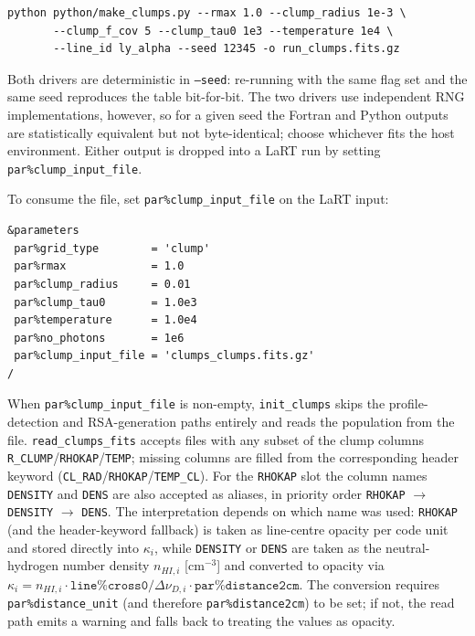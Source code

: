 \documentclass[english,a4paper]{my_memo}
\newcommand{\parm}[1]{\texttt{par\%#1}}
\begin{document}
\begin{lstlisting}
python python/make_clumps.py --rmax 1.0 --clump_radius 1e-3 \
       --clump_f_cov 5 --clump_tau0 1e3 --temperature 1e4 \
       --line_id ly_alpha --seed 12345 -o run_clumps.fits.gz
\end{lstlisting}

Both drivers are deterministic in \texttt{--seed}: re-running with the
same flag set and the same seed reproduces the table bit-for-bit.  The
two drivers use independent RNG implementations, however, so for a
given seed the Fortran and Python outputs are statistically equivalent
but not byte-identical; choose whichever fits the host environment.
Either output is dropped into a LaRT run by setting
\parm{clump\_input\_file}.

To consume the file, set \parm{clump\_input\_file} on the LaRT input:

\begin{lstlisting}
&parameters
 par%grid_type        = 'clump'
 par%rmax             = 1.0
 par%clump_radius     = 0.01
 par%clump_tau0       = 1.0e3
 par%temperature      = 1.0e4
 par%no_photons       = 1e6
 par%clump_input_file = 'clumps_clumps.fits.gz'
/
\end{lstlisting}

When \parm{clump\_input\_file} is non-empty, \texttt{init\_clumps} skips
the profile-detection and RSA-generation paths entirely and reads the
population from the file.  \texttt{read\_clumps\_fits} accepts files
with any subset of the clump columns
\texttt{R\_CLUMP}/\texttt{RHOKAP}/\texttt{TEMP}; missing columns are
filled from the corresponding header keyword
(\texttt{CL\_RAD}/\texttt{RHOKAP}/\texttt{TEMP\_CL}).  For the
\texttt{RHOKAP} slot the column names \texttt{DENSITY} and \texttt{DENS}
are also accepted as aliases, in priority order
\texttt{RHOKAP} $\to$ \texttt{DENSITY} $\to$ \texttt{DENS}.  The
interpretation depends on which name was used: \texttt{RHOKAP} (and the
header-keyword fallback) is taken as line-centre opacity per code unit
and stored directly into $\kappa_i$, while \texttt{DENSITY} or
\texttt{DENS} are taken as the neutral-hydrogen number density
$n_{HI,i}$ [cm$^{-3}$] and converted to opacity via
$\kappa_i = n_{HI,i}\cdot\texttt{line\%cross0}/\Delta\nu_{D,i}\cdot\parm{distance2cm}$.
The conversion requires \parm{distance\_unit} (and therefore
\parm{distance2cm}) to be set; if not, the read path emits a warning and
falls back to treating the values as opacity.
\end{document}
